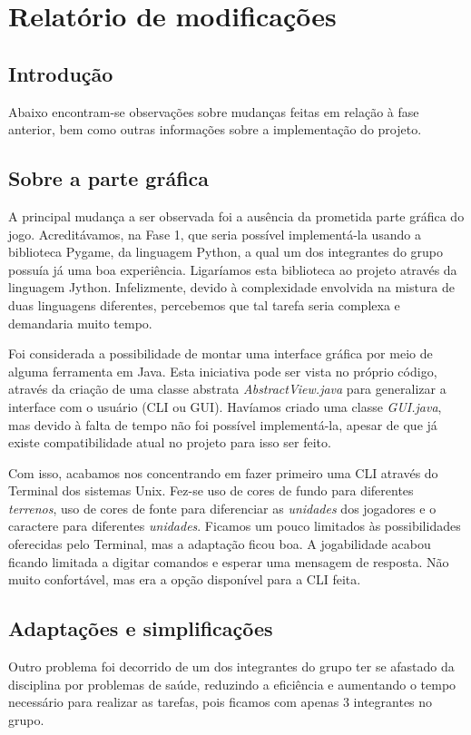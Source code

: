 \section{Relatório de modificações}

\subsection{Introdução}
    Abaixo encontram-se observações sobre mudanças feitas em relação à fase anterior, bem como outras informações sobre a implementação do projeto.

\subsection{Sobre a parte gráfica}
    A principal mudança a ser observada foi a ausência da prometida parte gráfica do jogo. Acreditávamos, na Fase 1, que seria possível implementá-la usando a biblioteca Pygame, da linguagem Python, a qual um dos integrantes do grupo possuía já uma boa experiência. Ligaríamos esta biblioteca ao projeto através da linguagem Jython. Infelizmente, devido à complexidade envolvida na mistura de duas linguagens diferentes, percebemos que tal tarefa seria complexa e demandaria muito tempo. \par

    Foi considerada a possibilidade de montar uma interface gráfica por meio de alguma ferramenta em Java. Esta iniciativa pode ser vista no próprio código, através da criação de uma classe abstrata \emph{AbstractView.java} para generalizar a interface com o usuário (CLI ou GUI). Havíamos criado uma classe \emph{GUI.java}, mas devido à falta de tempo não foi possível implementá-la, apesar de que já existe compatibilidade atual no projeto para isso ser feito. \par

    Com isso, acabamos nos concentrando em fazer primeiro uma CLI através do Terminal dos sistemas Unix. Fez-se uso de cores de fundo para diferentes \emph{terrenos}, uso de cores de fonte para diferenciar as \emph{unidades} dos jogadores e o caractere para diferentes \emph{unidades}. Ficamos um pouco limitados às possibilidades oferecidas pelo Terminal, mas a adaptação ficou boa. A jogabilidade acabou ficando limitada a digitar comandos e esperar uma mensagem de resposta. Não muito confortável, mas era a opção disponível para a CLI feita.

\subsection{Adaptações e simplificações}
    Outro problema foi decorrido de um dos integrantes do grupo ter se afastado da disciplina por problemas de saúde, reduzindo a eficiência e aumentando o tempo necessário para realizar as tarefas, pois ficamos com apenas 3 integrantes no grupo. \par

